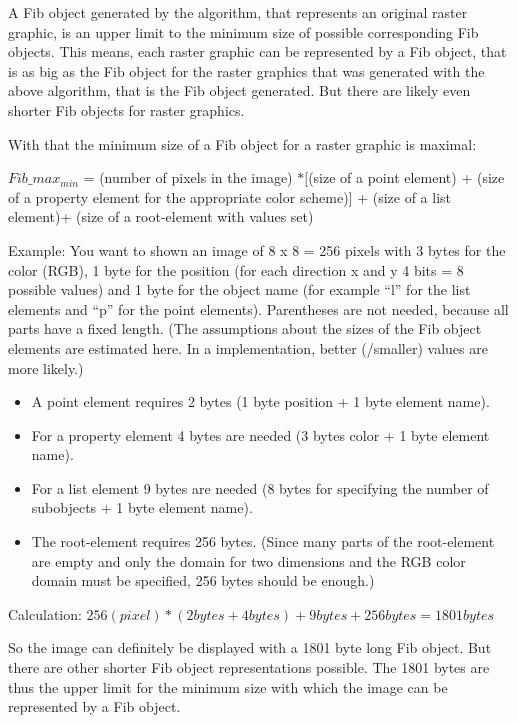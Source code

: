 A Fib object generated by the algorithm, that represents an original raster graphic, is an upper limit to the minimum size of possible corresponding Fib objects. This means, each raster graphic can be represented by a Fib object, that is as big as the Fib object for the raster graphics that was generated with the above algorithm, that is the Fib object generated. But there are likely even shorter Fib objects for raster graphics.

\begin{flushleft}
With that the minimum size of a Fib object for a raster graphic is maximal:

$Fib\_max_{min}$ = (number of pixels in the image) $* [$(size of a point element) + (size of a property element for the appropriate color scheme)$]$ + (size of a list element)+ (size of a root-element with values set)

\bigskip\noindent
Example: You want to shown an image of 8 x 8 = 256 pixels with 3 bytes for the color (RGB), 1 byte for the position (for each direction x and y 4 bits = 8 possible values) and 1 byte for the object name (for example ``l'' for the list elements and ``p'' for the point elements). Parentheses are not needed, because all parts have a fixed length. (The assumptions about the sizes of the Fib object elements are estimated here. In a implementation, better (/smaller) values are more likely.)

\begin{itemize}
 \item A point element requires 2 bytes (1 byte position + 1 byte element name).
 \item For a property element 4 bytes are needed (3 bytes color + 1 byte element name).
 \item For a list element 9 bytes are needed (8 bytes for specifying the number of subobjects + 1 byte element name).
 \item The root-element requires 256 bytes. (Since many parts of the root-element are empty and only the domain for two dimensions and the RGB color domain must be specified, 256 bytes should be enough.)
\end{itemize}

\bigskip\noindent
Calculation:
$256 (pixel) * (2 bytes + 4 bytes) + 9 bytes + 256 bytes = 1801 bytes$

\bigskip\noindent
So the image can definitely be displayed with a 1801 byte long Fib object. But there are other shorter Fib object representations possible. The 1801 bytes are thus the upper limit for the minimum size with which the image can be represented by a Fib object.


\end{flushleft}
